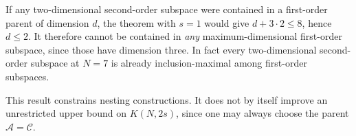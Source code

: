 \documentclass{article}
\begin{document}
If any two-dimensional second-order subspace were contained in a
first-order parent of dimension $d$, the theorem with $s=1$ would give
$d+3\cdot2\le8$, hence $d\le2$. It therefore cannot be contained in
\emph{any} maximum-dimensional first-order subspace, since those have
dimension three. In fact every two-dimensional second-order subspace
at $N=7$ is already inclusion-maximal among first-order subspaces.

This result constrains nesting constructions. It does not by itself
improve an unrestricted upper bound on $K(N,2s)$, since one may always
choose the parent $\mathcal A=\mathcal C$.
\end{document}
